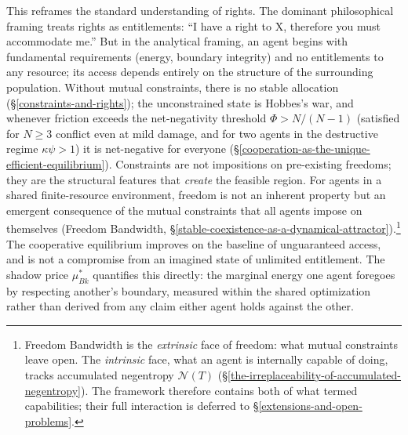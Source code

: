\documentclass[11pt]{article}
\theoremstyle{plain}
\theoremstyle{definition}
\theoremstyle{remark}
\begin{document}
This reframes the standard understanding of rights. The dominant
philosophical framing treats rights as entitlements: ``I have a right to
X, therefore you must accommodate me.'' But in the analytical framing,
an agent begins with fundamental requirements (energy, boundary
integrity) and no entitlements to any resource; its access depends
entirely on the structure of the surrounding population. Without mutual
constraints, there is no stable allocation
(§\ref{constraints-and-rights}); the unconstrained state is Hobbes's
war, and whenever friction exceeds the net-negativity threshold
\(\Phi > N/(N-1)\) (satisfied for \(N \geq 3\) conflict even at mild
damage, and for two agents in the destructive regime \(\kappa\psi > 1\))
it is net-negative for everyone
(§\ref{cooperation-as-the-unique-efficient-equilibrium}). Constraints
are not impositions on pre-existing freedoms; they are the structural
features that \emph{create} the feasible region. For agents in a shared
finite-resource environment, freedom is not an inherent property but an
emergent consequence of the mutual constraints that all agents impose on
themselves (Freedom Bandwidth,
§\ref{stable-coexistence-as-a-dynamical-attractor}).\footnote{Freedom
  Bandwidth is the \emph{extrinsic} face of freedom: what mutual
  constraints leave open. The \emph{intrinsic} face, what an agent is
  internally capable of doing, tracks accumulated negentropy
  \(\mathcal{N}(T)\)
  (§\ref{the-irreplaceability-of-accumulated-negentropy}). The framework
  therefore contains both of what \citet{Sen1985} termed capabilities;
  their full interaction is deferred to
  §\ref{extensions-and-open-problems}.} The cooperative equilibrium
improves on the baseline of unguaranteed access, and is not a compromise
from an imagined state of unlimited entitlement. The shadow price
\(\mu^*_{Bk}\) quantifies this directly: the marginal energy one agent
foregoes by respecting another's boundary, measured within the shared
optimization rather than derived from any claim either agent holds
against the other.
\end{document}
